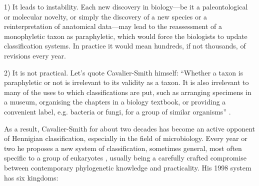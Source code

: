 \begin{artengenv}
1) It leads to instability. Each new discovery in biology---be it a paleontological or molecular novelty, or simply the
discovery of a new species or a reinterpretation of anatomical data---may lead to the reassessment of a monophyletic
taxon as paraphyletic, which would force the biologists to update classification systems. In practice it would mean
hundreds, if not thousands, of revisions every year.

2) It is not practical. Let’s quote Cavalier-Smith himself: ``Whether a taxon is paraphyletic or not is irrelevant to its
validity as a taxon. It is also irrelevant to many of the uses to which classifications are put, such as arranging
specimens in a museum, organising the chapters in a biology textbook, or providing a convenient label, e.g. bacteria or
fungi, for a group of similar organisms''
\parencite[p.212]{cavalier-smith_revised_1998}.

As a result, Cavalier-Smith for about two decades has become an active opponent of Hennigian classification, especially
in the field of microbiology. Every year or two he proposes a new system of classification, sometimes general, most
often specific to a group of eukaryotes
\parencite{cavalier-smith_phagotrophic_2002,cavalier-smith_early_2013,cavalier-smith_higher_2016},
usually
being a carefully crafted compromise between contemporary phylogenetic knowledge and practicality. His 1998 system
\parencite{cavalier-smith_revised_1998}
has six kingdoms:


\end{artengenv}
